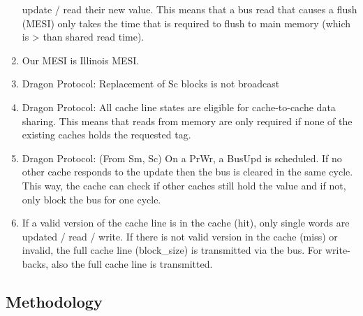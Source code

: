 \begin{enumerate}
          update / read their new value. This means that a bus read that causes a flush (MESI) only takes the
          time that is required to flush to main memory (which is > than shared read time).
    \item Our MESI is Illinois MESI.
    \item Dragon Protocol: Replacement of Sc blocks is not broadcast
    \item Dragon Protocol: All cache line states are eligible for cache-to-cache data sharing. This
          means that reads from memory are only required if none of the existing caches holds the requested
          tag.
    \item Dragon Protocol: (From Sm, Sc) On a PrWr, a BusUpd is scheduled. If no other cache responds to
          the update then the bus is cleared in the same cycle. This way, the cache can check if other caches
          still hold the value and if not, only block the bus for one cycle.
    \item If a valid version of the cache line is in the cache (hit), only single words are updated /
          read / write. If there is not valid version in the cache (miss) or invalid, the full cache line
          (block\_size) is transmitted via the bus. For write-backs, also the full cache line is transmitted.
\end{enumerate}
\subsection{Methodology}
